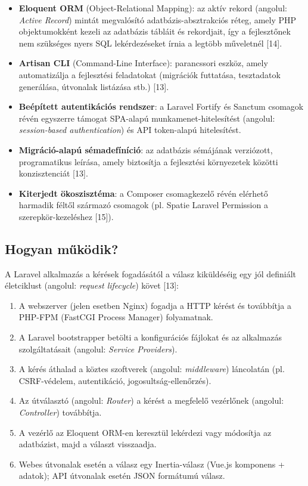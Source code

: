 \begin{itemize}
\item
  \textbf{Eloquent ORM} (Object-Relational Mapping): az aktív rekord (angolul: \emph{Active Record}) mintát megvalósító adatbázis-absztrakciós réteg, amely PHP objektumokként kezeli az adatbázis tábláit és rekordjait, így a fejlesztőnek nem szükséges nyers SQL lekérdezéseket írnia a legtöbb műveletnél {[}14{]}.
\item
  \textbf{Artisan CLI} (Command-Line Interface): parancssori eszköz, amely automatizálja a fejlesztési feladatokat (migrációk futtatása, tesztadatok generálása, útvonalak listázása stb.) {[}13{]}.
\item
  \textbf{Beépített autentikációs rendszer}: a Laravel Fortify és Sanctum csomagok révén egyszerre támogat SPA-alapú munkamenet-hitelesítést (angolul: \emph{session-based authentication}) és API token-alapú hitelesítést.
\item
  \textbf{Migráció-alapú sémadefíníció}: az adatbázis sémájának verziózott, programatikus leírása, amely biztosítja a fejlesztési környezetek közötti konzisztenciát {[}13{]}.
\item
  \textbf{Kiterjedt ökoszisztéma}: a Composer csomagkezelő révén elérhető harmadik féltől származó csomagok (pl. Spatie Laravel Permission a szerepkör-kezeléshez {[}15{]}).
\end{itemize}

\subsection{Hogyan működik?}\label{hogyan-mux171kuxf6dik-2}

A Laravel alkalmazás a kérések fogadásától a válasz kiküldéséig egy jól definiált életciklust (angolul: \emph{request lifecycle}) követ {[}13{]}:

\begin{enumerate}
\def\labelenumi{\arabic{enumi}.}
\item
  A webszerver (jelen esetben Nginx) fogadja a HTTP kérést és továbbítja a PHP-FPM (FastCGI Process Manager) folyamatnak.
\item
  A Laravel bootstrapper betölti a konfigurációs fájlokat és az alkalmazás szolgáltatásait (angolul: \emph{Service Providers}).
\item
  A kérés áthalad a köztes szoftverek (angolul: \emph{middleware}) láncolatán (pl. CSRF-védelem, autentikáció, jogosultság-ellenőrzés).
\item
  Az útválasztó (angolul: \emph{Router}) a kérést a megfelelő vezérlőnek (angolul: \emph{Controller}) továbbítja.
\item
  A vezérlő az Eloquent ORM-en keresztül lekérdezi vagy módosítja az adatbázist, majd a választ visszaadja.
\item
  Webes útvonalak esetén a válasz egy Inertia-válasz (Vue.js komponens + adatok); API útvonalak esetén JSON formátumú válasz.
\end{enumerate}

